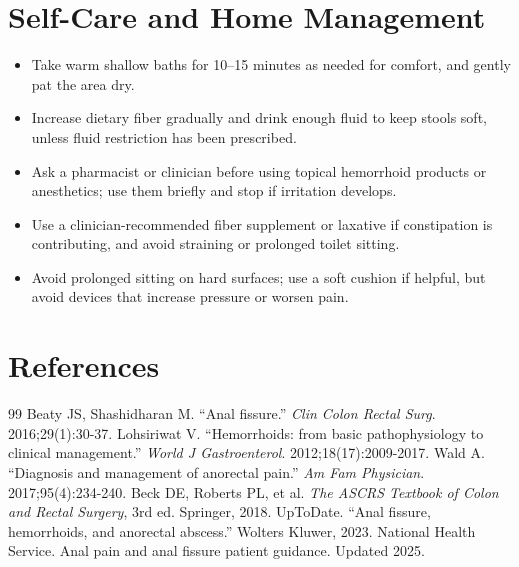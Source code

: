 \section*{Self-Care and Home Management}
\begin{itemize}
 \item Take warm shallow baths for 10--15 minutes as needed for comfort, and gently pat the area dry.
 \item Increase dietary fiber gradually and drink enough fluid to keep stools soft, unless fluid restriction has been prescribed.
 \item Ask a pharmacist or clinician before using topical hemorrhoid products or anesthetics; use them briefly and stop if irritation develops.
 \item Use a clinician-recommended fiber supplement or laxative if constipation is contributing, and avoid straining or prolonged toilet sitting.
 \item Avoid prolonged sitting on hard surfaces; use a soft cushion if helpful, but avoid devices that increase pressure or worsen pain.
\end{itemize}

\section*{References}
\begin{thebibliography}{99}
 Beaty JS, Shashidharan M. ``Anal fissure.'' \textit{Clin Colon Rectal Surg}. 2016;29(1):30-37.
 Lohsiriwat V. ``Hemorrhoids: from basic pathophysiology to clinical management.'' \textit{World J Gastroenterol}. 2012;18(17):2009-2017.
 Wald A. ``Diagnosis and management of anorectal pain.'' \textit{Am Fam Physician}. 2017;95(4):234-240.
 Beck DE, Roberts PL, et al. \textit{The ASCRS Textbook of Colon and Rectal Surgery}, 3rd ed. Springer, 2018.
 UpToDate. ``Anal fissure, hemorrhoids, and anorectal abscess.'' Wolters Kluwer, 2023.
 National Health Service. Anal pain and anal fissure patient guidance. Updated 2025.
\end{thebibliography}
